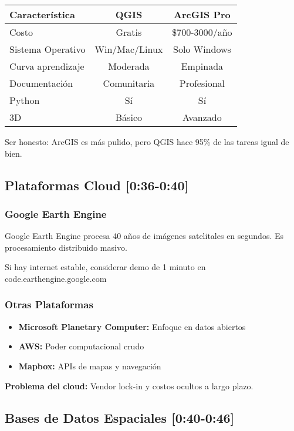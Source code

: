 \documentclass[11pt,a4paper]{article}
\newcommand{\tiempo}[1]{\textcolor{timecolor}{\textbf{[#1]}}}
\newcommand{\decir}[1]{\begin{tcolorbox}[colback=blue!5,colframe=usachblue,title={DECIR}]#1\end{tcolorbox}}
\newcommand{\nota}[1]{\begin{tcolorbox}[colback=yellow!10,colframe=orange,title={NOTA}]#1\end{tcolorbox}}
\newcommand{\alerta}[1]{\begin{tcolorbox}[colback=red!5,colframe=red,title={ALERTA}]#1\end{tcolorbox}}
\begin{document}
\begin{center}
\begin{tabular}{|l|c|c|}
\hline
\textbf{Característica} & \textbf{QGIS} & \textbf{ArcGIS Pro} \\
\hline
Costo & Gratis & \$700-3000/año \\
Sistema Operativo & Win/Mac/Linux & Solo Windows \\
Curva aprendizaje & Moderada & Empinada \\
Documentación & Comunitaria & Profesional \\
Python & Sí & Sí \\
3D & Básico & Avanzado \\
\hline
\end{tabular}
\end{center}

\nota{Ser honesto: ArcGIS es más pulido, pero QGIS hace 95\% de las tareas igual de bien.}

\subsection{Plataformas Cloud \tiempo{0:36-0:40}}

\subsubsection{Google Earth Engine}

\decir{Google Earth Engine procesa 40 años de imágenes satelitales en segundos. Es procesamiento distribuido masivo.}

\alerta{Si hay internet estable, considerar demo de 1 minuto en code.earthengine.google.com}

\subsubsection{Otras Plataformas}

\begin{itemize}
    \item \textbf{Microsoft Planetary Computer:} Enfoque en datos abiertos
    \item \textbf{AWS:} Poder computacional crudo
    \item \textbf{Mapbox:} APIs de mapas y navegación
\end{itemize}

\textbf{Problema del cloud:} Vendor lock-in y costos ocultos a largo plazo.

\subsection{Bases de Datos Espaciales \tiempo{0:40-0:46}}
\end{document}
